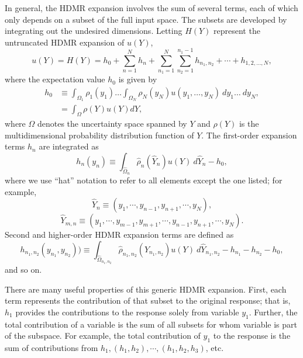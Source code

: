 In general, the HDMR expansion involves the sum of several terms, each of which only depends on a subset of
the full input space.  The subsets are developed by integrating out the undesired dimensions.  Letting $H(Y)$
represent the untruncated HDMR expansion of $u(Y)$,
\begin{equation}\label{eq:anova}
  u(Y) = H(Y) = h_0 + \sum_{n=1}^N h_n + \sum_{n_1=1}^N \sum_{n_2=1}^{n_1-1} h_{n_1,n_2} + \cdots +
  h_{1,2,\ldots,N},
\end{equation}
where the expectation value $h_0$ is given by
\begin{align}\label{eq:hdmr 0}
  h_0 &\equiv \int_{\Omega_1} \rho_1(y_1)\ldots\int_{\Omega_N} \rho_N(y_N) u(y_1,\ldots,y_N)\ dy_1\ldots\ dy_N, \\
    &= \int_\Omega \rho(Y) u(Y) dY,
\end{align}
where $\Omega$ denotes the uncertainty space spanned by $Y$ and $\rho(Y)$ is the multidimensional probability distribution
function of $Y$. The first-order expansion terms $h_n$ are integrated as
\begin{equation}\label{eq:hdmr 1}
  h_n(y_n) \equiv \int_{\hat\Omega_n} \hat\rho_n(\hat Y_n) u(Y)\ d\hat Y_n - h_0,
\end{equation}
where we use ``hat'' notation to refer to all elements except the one listed; for example,
\begin{equation}
  \hat Y_n \equiv (y_1,\cdots,y_{n-1},y_{n+1},\cdots,y_N),
\end{equation}
\begin{equation}
  \hat Y_{m,n} \equiv (y_1,\cdots,y_{m-1},y_{m+1},\cdots,y_{n-1},y_{n+1},\cdots,y_N).
\end{equation}
Second and higher-order HDMR expansion terms are defined as
\begin{equation}\label{eq:hdmr 2}
  h_{n_1,n_2}(y_{n_1},y_{n_2})) \equiv \int_{\hat\Omega_{n_1,n_2}} \hat\rho_{n_1,n_2}(\hat Y_{n_1,n_2}) u(Y)\
      d\hat Y_{n_1,n_2} - h_{n_1} - h_{n_2} - h_0,
\end{equation}
and so on.

There are many useful properties of this generic HDMR expansion.  First, each term represents the contribution
of that subset to the original response; that is, $h_1$ provides the contributions to the response solely
from variable $y_1$.  Further, the total contribution of a variable is the sum of all subsets for whom
variable is part of the subspace.  For example, the total contribution of $y_1$ to the response is the sum of
contributions from $h_1,(h_1,h_2),\cdots,(h_1,h_2,h_3)$, etc.

